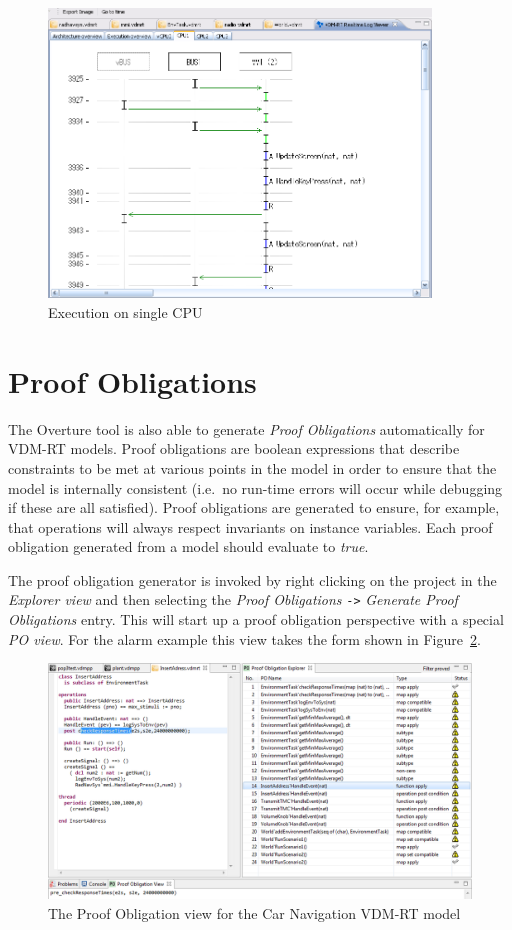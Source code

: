\begin{figure}[htp]
\begin{center}
  \includegraphics[width=4in]{figures/ExecutionCPU}
  \caption{Execution on single CPU}
  \label{fig:userguide:ExecutionCPU}
\end{center}
\end{figure}

\section{Proof Obligations}\label{sec:PO}

The Overture tool is also able to generate \emph{Proof Obligations}
automatically for VDM-RT models. Proof obligations are boolean
expressions that describe constraints to be met at various points in
the model in order to ensure that the model is internally consistent
(i.e.\ no run-time errors will occur while debugging if these are all
satisfied). Proof obligations are generated to ensure, for example,
that operations will always respect invariants on instance
variables. Each proof obligation generated from a model should
evaluate to \emph{true}.

The proof obligation generator is invoked by right clicking on the
project in the \emph{Explorer view} and then selecting the \emph{Proof
  Obligations} \texttt{->} \emph{Generate Proof Obligations}
entry. This will start up a proof obligation perspective with a
special \emph{PO view}. For the alarm example this view takes the form
shown in Figure~\ref{fig:POview}.

\begin{figure}[htbp]
\begin{center}
\includegraphics[width=4.5in]{figures/POviewRT}
\caption{The Proof Obligation view for the Car Navigation VDM-RT model\label{fig:POview}}
\end{center}
\end{figure}

